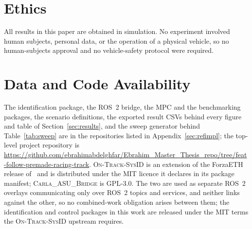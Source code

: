 \documentclass[journal]{IEEEtran}
\newcommand{\bridge}{\textsc{Carla\_ASU\_Bridge}}
\newcommand{\sysid}{\textsc{On-Track-SysID}}
\begin{document}
\section*{Ethics}
All results in this paper are obtained in simulation. No experiment involved
human subjects, personal data, or the operation of a physical vehicle, so no
human-subjects approval and no vehicle-safety protocol were required.

\section*{Data and Code Availability}
The identification package, the ROS~2 bridge, the MPC and the benchmarking
packages, the scenario definitions, the exported result CSVs behind every
figure and table of Section~\ref{sec:results}, and the sweep generator behind
Table~\ref{tab:sweep} are in the repositories listed in
Appendix~\ref{sec:refimpl}; the top-level project repository is
\url{https://github.com/ebrahimabdelghfar/Ebrahim_Master_Thesis_repo/tree/feat-follow-premade-racing-track}. \sysid{} is an extension of the ForzaETH release
of~\cite{ontrack2025} and is distributed under the MIT licence it declares in
its package manifest; \bridge{} is GPL-3.0. The two
are used as separate ROS~2 overlays communicating only over ROS~2 topics and
services, and neither links against the other, so no combined-work obligation
arises between them; the identification and control packages in this work are
released under the MIT terms the \sysid{} upstream requires.



\end{document}
